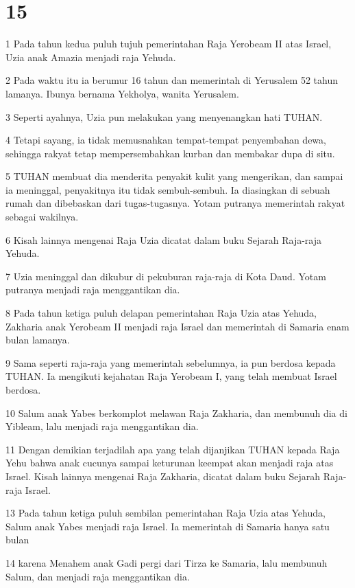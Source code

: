 \chapter{15}

\par 1 Pada tahun kedua puluh tujuh pemerintahan Raja Yerobeam II atas Israel, Uzia anak Amazia menjadi raja Yehuda.
\par 2 Pada waktu itu ia berumur 16 tahun dan memerintah di Yerusalem 52 tahun lamanya. Ibunya bernama Yekholya, wanita Yerusalem.
\par 3 Seperti ayahnya, Uzia pun melakukan yang menyenangkan hati TUHAN.
\par 4 Tetapi sayang, ia tidak memusnahkan tempat-tempat penyembahan dewa, sehingga rakyat tetap mempersembahkan kurban dan membakar dupa di situ.
\par 5 TUHAN membuat dia menderita penyakit kulit yang mengerikan, dan sampai ia meninggal, penyakitnya itu tidak sembuh-sembuh. Ia diasingkan di sebuah rumah dan dibebaskan dari tugas-tugasnya. Yotam putranya memerintah rakyat sebagai wakilnya.
\par 6 Kisah lainnya mengenai Raja Uzia dicatat dalam buku Sejarah Raja-raja Yehuda.
\par 7 Uzia meninggal dan dikubur di pekuburan raja-raja di Kota Daud. Yotam putranya menjadi raja menggantikan dia.
\par 8 Pada tahun ketiga puluh delapan pemerintahan Raja Uzia atas Yehuda, Zakharia anak Yerobeam II menjadi raja Israel dan memerintah di Samaria enam bulan lamanya.
\par 9 Sama seperti raja-raja yang memerintah sebelumnya, ia pun berdosa kepada TUHAN. Ia mengikuti kejahatan Raja Yerobeam I, yang telah membuat Israel berdosa.
\par 10 Salum anak Yabes berkomplot melawan Raja Zakharia, dan membunuh dia di Yibleam, lalu menjadi raja menggantikan dia.
\par 11 Dengan demikian terjadilah apa yang telah dijanjikan TUHAN kepada Raja Yehu bahwa anak cucunya sampai keturunan keempat akan menjadi raja atas Israel. Kisah lainnya mengenai Raja Zakharia, dicatat dalam buku Sejarah Raja-raja Israel.
\par 13 Pada tahun ketiga puluh sembilan pemerintahan Raja Uzia atas Yehuda, Salum anak Yabes menjadi raja Israel. Ia memerintah di Samaria hanya satu bulan
\par 14 karena Menahem anak Gadi pergi dari Tirza ke Samaria, lalu membunuh Salum, dan menjadi raja menggantikan dia.
